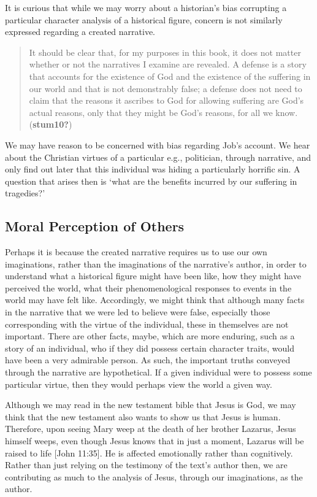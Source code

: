 \documentclass[12pt]{book}
\theoremstyle{definition}
\theoremstyle{remark}
\begin{document}
It is curious that while we may worry about a historian's bias corrupting a particular character analysis of a historical figure, concern is not similarly expressed regarding a created narrative.

\begin{quote}
It should be clear that, for my purposes in this book, it does not matter whether or not the narratives I examine are revealed. A defense is a story that accounts for the existence of God and the existence of the suffering in our world and that is not demonstrably false; a defense does not need to claim that the reasons it ascribes to God for allowing suffering are God's actual reasons, only that they might be God's reasons, for all we know. (\textbf{stum10?})
\end{quote}

We may have reason to be concerned with bias regarding Job's account. We hear about the Christian virtues of a particular e.g., politician, through narrative, and only find out later that this individual was hiding a particularly horrific sin. A question that arises then is `what are the benefits incurred by our suffering in tragedies?'

\subsection*{Moral Perception of Others}\label{moral-perception-of-others}

Perhaps it is because the created narrative requires us to use our own imaginations, rather than the imaginations of the narrative's author, in order to understand what a historical figure might have been like, how they might have perceived the world, what their phenomenological responses to events in the world may have felt like. Accordingly, we might think that although many facts in the narrative that we were led to believe were false, especially those corresponding with the virtue of the individual, these in themselves are not important. There are other facts, maybe, which are more enduring, such as a story of an individual, who if they did possess certain character traits, would have been a very admirable person. As such, the important truths conveyed through the narrative are hypothetical. If a given individual were to possess some particular virtue, then they would perhaps view the world a given way.

Although we may read in the new testament bible that Jesus is God, we may think that the new testament also wants to show us that Jesus is human. Therefore, upon seeing Mary weep at the death of her brother Lazarus, Jesus himself weeps, even though Jesus knows that in just a moment, Lazarus will be raised to life {[}John 11:35{]}. He is affected emotionally rather than cognitively. Rather than just relying on the testimony of the text's author then, we are contributing as much to the analysis of Jesus, through our imaginations, as the author.
\end{document}
